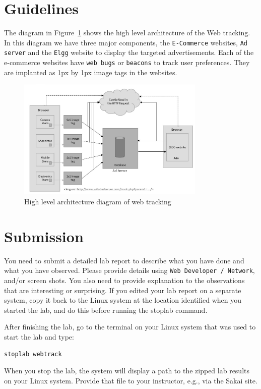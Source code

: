 \section{Guidelines}

The diagram in Figure~\ref{fig:guideline_figure} shows the high level architecture of the Web tracking. 
In this diagram we have three major components, the {\tt E-Commerce} websites, {\tt Ad server} and the {\tt Elgg} website to display the targeted advertisements. 
Each of the e-commerce websites have {\tt web bugs} or {\tt beacons} to track user preferences. 
They are implanted as 1px by 1px image tags in the websites.

	\begin{figure}
	\centering
	\includegraphics[width=0.8\textwidth,natwidth=621,natheight=403]{Figs/Guidelinefigure.jpg}
	\caption{High level architecture diagram of web tracking} 
	\label{fig:guideline_figure}
	\end{figure}


\section{Submission}

You need to submit a detailed lab report to describe what you have
done and what you have observed. Please provide details using 
{\tt Web Developer / Network}, and/or screen shots. 
You also need to provide explanation
to the observations that are interesting or surprising.
If you edited your lab report on a separate system, copy it back to the Linux system at the location
identified when you started the lab, and do this before running the stoplab command.

After finishing the lab, go to the terminal on your Linux system that was used to start the lab and type:
\begin{verbatim}
stoplab webtrack
\end{verbatim}
When you stop the lab, the system will display a path to the zipped lab results on your Linux system.  Provide that file to
your instructor, e.g., via the Sakai site.


